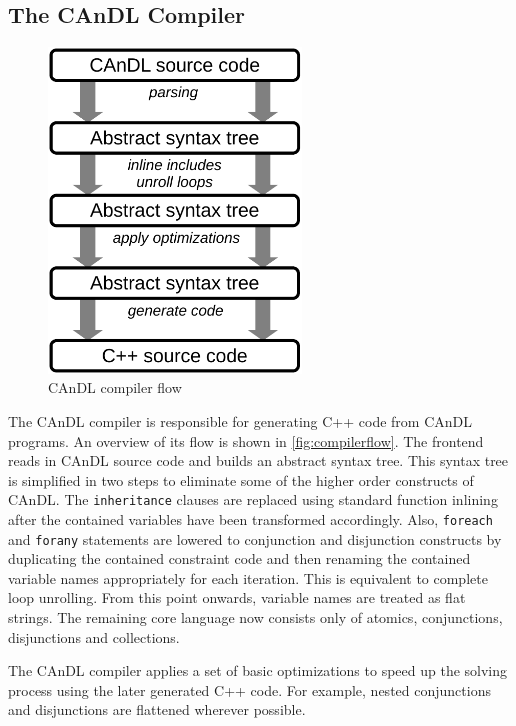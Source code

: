 \subsection{The CAnDL Compiler}

\begin{figure}[t]
\centering
\includegraphics[width=0.6\textwidth]{figures/candlstages.pdf}
\caption{CAnDL compiler flow}
\label{fig:compilerflow}
\end{figure}

    The CAnDL compiler is responsible for generating C++ code from CAnDL
    programs.
    An overview of its  flow is shown in \autoref{fig:compilerflow}.
    The frontend reads in  CAnDL source code and builds an abstract syntax tree.
    This syntax tree is simplified in two steps to eliminate some of the higher
    order constructs of CAnDL.
    The \texttt{inheritance} clauses are replaced using standard function
    inlining after the contained variables have been transformed accordingly.
    Also, \texttt{foreach} and \texttt{forany} statements are lowered to
    conjunction and disjunction constructs by duplicating the contained
    constraint code and then renaming the contained variable names appropriately
    for each iteration.
    This is equivalent to complete loop unrolling.
    From this point onwards, variable names are treated as flat strings.
    The remaining core language now consists only of atomics, conjunctions,
    disjunctions and collections.

    The CAnDL compiler applies a set of basic optimizations to speed up the
    solving process using the later generated C++ code.
    For example, nested conjunctions and disjunctions are flattened wherever
    possible.

